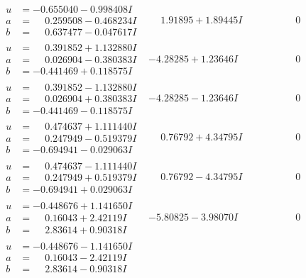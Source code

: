 \documentclass[1p]{elsarticle_modified}
\theoremstyle{definition}
\begin{document}
$$\begin{array}{c|c|c}
\begin{aligned}
u &= -0.655040 - 0.998408 I \\
a &= \phantom{-}0.259508 - 0.468234 I \\
b &= \phantom{-}0.637477 - 0.047617 I\end{aligned}
 & \phantom{-}1.91895 + 1.89445 I & \phantom{-0.000000 } 0 \\ \hline\begin{aligned}
u &= \phantom{-}0.391852 + 1.132880 I \\
a &= \phantom{-}0.026904 - 0.380383 I \\
b &= -0.441469 + 0.118575 I\end{aligned}
 & -4.28285 + 1.23646 I & \phantom{-0.000000 } 0 \\ \hline\begin{aligned}
u &= \phantom{-}0.391852 - 1.132880 I \\
a &= \phantom{-}0.026904 + 0.380383 I \\
b &= -0.441469 - 0.118575 I\end{aligned}
 & -4.28285 - 1.23646 I & \phantom{-0.000000 } 0 \\ \hline\begin{aligned}
u &= \phantom{-}0.474637 + 1.111440 I \\
a &= \phantom{-}0.247949 - 0.519379 I \\
b &= -0.694941 - 0.029063 I\end{aligned}
 & \phantom{-}0.76792 + 4.34795 I & \phantom{-0.000000 } 0 \\ \hline\begin{aligned}
u &= \phantom{-}0.474637 - 1.111440 I \\
a &= \phantom{-}0.247949 + 0.519379 I \\
b &= -0.694941 + 0.029063 I\end{aligned}
 & \phantom{-}0.76792 - 4.34795 I & \phantom{-0.000000 } 0 \\ \hline\begin{aligned}
u &= -0.448676 + 1.141650 I \\
a &= \phantom{-}0.16043 + 2.42119 I \\
b &= \phantom{-}2.83614 + 0.90318 I\end{aligned}
 & -5.80825 - 3.98070 I & \phantom{-0.000000 } 0 \\ \hline\begin{aligned}
u &= -0.448676 - 1.141650 I \\
a &= \phantom{-}0.16043 - 2.42119 I \\
b &= \phantom{-}2.83614 - 0.90318 I\end{aligned}

\end{array}$$
\end{document}
